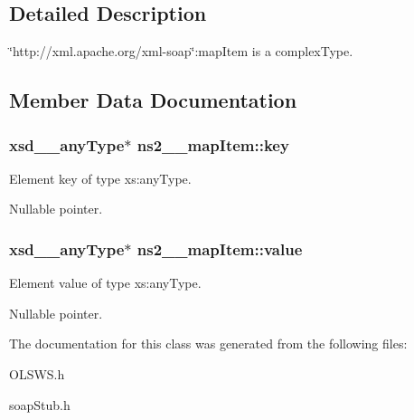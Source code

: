 \subsection{Detailed Description}
\char`\"{}http://xml.apache.org/xml-\/soap\char`\"{}:mapItem is a complexType. 

\subsection{Member Data Documentation}
\hypertarget{classns2____mapItem_a3307ddb876ac652c96ddd8b9be153672}{
\subsubsection[{key}]{\setlength{\rightskip}{0pt plus 5cm}xsd\_\-\_\-anyType$\ast$ {\bf ns2\_\-\_\-mapItem::key}}}
\label{classns2____mapItem_a3307ddb876ac652c96ddd8b9be153672}


Element key of type xs:anyType. 

Nullable pointer. \hypertarget{classns2____mapItem_a293e189c48932a5bec66e397e0c813de}{
\subsubsection[{value}]{\setlength{\rightskip}{0pt plus 5cm}xsd\_\-\_\-anyType$\ast$ {\bf ns2\_\-\_\-mapItem::value}}}
\label{classns2____mapItem_a293e189c48932a5bec66e397e0c813de}


Element value of type xs:anyType. 

Nullable pointer. 

The documentation for this class was generated from the following files:\begin{DoxyCompactItemize}
\item 
OLSWS.h\item 
soapStub.h\end{DoxyCompactItemize}
